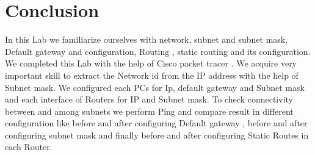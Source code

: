 \documentclass[a4paper,11pt]{article}
\begin{document}

\section{Conclusion}
In this Lab we familiarize ourselves with network, subnet and subnet mask, Default gateway and configuration, Routing , static routing and its configuration. We completed this Lab with the help of Cisco packet tracer . We acquire very important skill to extract the Network id from the IP address with the help of Subnet mask. We configured each PCs for Ip, default gateway and  Subnet mask and each interface of Routers for IP and Subnet mask. To check connectivity between and among subnets we perform Ping and compare result in different configuration like before and after configuring Default gateway , before and after configuring  subnet mask and finally before and  after configuring Static Routes in each Router.
\end{document}
